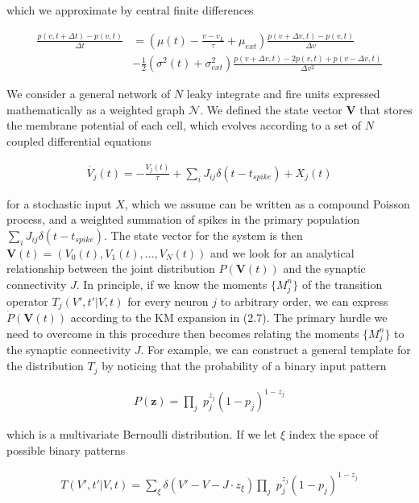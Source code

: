 \documentclass{ucetd}
\begin{document}
which we approximate by central finite differences

\begin{align*}
\frac{p(v, t+\Delta t) - p(v,t)}{\Delta t} &= \left(\mu(t) - \frac{v-v_{L}}{\tau}+ \mu_{ext}\right)\frac{p(v+\Delta v, t) - p(v,t)}{\Delta v} \\
&- \frac{1}{2}\left(\sigma^{2}(t) + \sigma_{ext}^{2}\right)\frac{p(v+\Delta v, t) - 2p(v,t) + p(v-\Delta v, t)}{\Delta v^{2}}
\end{align*} 

We consider a general network of $N$ leaky integrate and fire units expressed mathematically as a weighted graph $\mathcal{N}$. We defined the state vector $\mathbf{V}$ that stores the membrane potential of each cell, which evolves according to a set of $N$ coupled differential equations

\begin{align*}
\dot{V_{j}}(t) = -\frac{V_{j}(t)}{\tau} + \sum_{i}J_{ij}\delta(t-t_{spike}) + X_{j}(t)
\end{align*}

for a stochastic input $X$, which we assume can be written as a compound Poisson process, and a weighted summation of spikes in the primary population $\sum_{i}J_{ij}\delta(t-t_{spike})$. The state vector for the system is then $\mathbf{V}(t) = (V_{0}(t), V_{1}(t), ..., V_{N}(t))$ and we look for an analytical relationship between the joint distribution $P(\mathbf{V}(t))$ and the synaptic connectivity $J$. In principle, if we know the moments $\{M_{j}^{n}\}$  of the transition operator $T_{j}(V',t'|V,t)$ for every neuron $j$ to arbitrary order, we can express $\dot{P}(\mathbf{V}(t))$ according to the KM expansion in (2.7). The primary hurdle we need to overcome in this procedure then becomes relating the moments $\{M_{j}^{n}\}$ to the synaptic connectivity $J$. For example, we can construct a general template for the distribution $T_{j}$ by noticing that the probability of a binary input pattern

\begin{align*}
P(\mathbf{z}) = \underset{j}{\prod} \; p_{j}^{z_{j}}(1-p_{j})^{1-z_{j}}
\end{align*}

which is a multivariate Bernoulli distribution. If we let $\xi$ index the space of possible binary patterns

\begin{align}
T(V',t'|V,t) = \sum_{\xi} \delta(V'- V - J\cdot z_{\xi})\underset{j}{\prod} \; p_{j}^{z_{j}}(1-p_{j})^{1-z_{j}}
\end{align}
\end{document}
